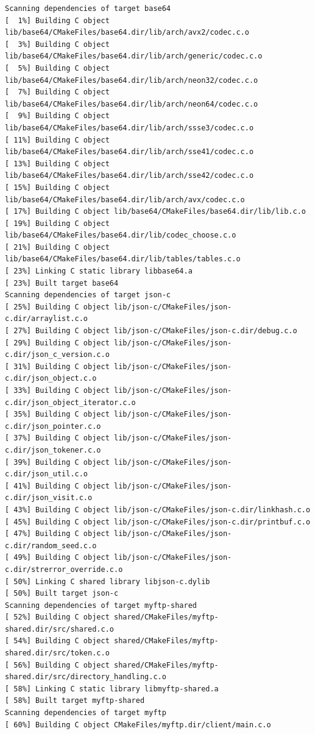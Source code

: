 \documentclass{article}
\begin{document}
\begin{lstlisting}
Scanning dependencies of target base64
[  1%] Building C object lib/base64/CMakeFiles/base64.dir/lib/arch/avx2/codec.c.o
[  3%] Building C object lib/base64/CMakeFiles/base64.dir/lib/arch/generic/codec.c.o
[  5%] Building C object lib/base64/CMakeFiles/base64.dir/lib/arch/neon32/codec.c.o
[  7%] Building C object lib/base64/CMakeFiles/base64.dir/lib/arch/neon64/codec.c.o
[  9%] Building C object lib/base64/CMakeFiles/base64.dir/lib/arch/ssse3/codec.c.o
[ 11%] Building C object lib/base64/CMakeFiles/base64.dir/lib/arch/sse41/codec.c.o
[ 13%] Building C object lib/base64/CMakeFiles/base64.dir/lib/arch/sse42/codec.c.o
[ 15%] Building C object lib/base64/CMakeFiles/base64.dir/lib/arch/avx/codec.c.o
[ 17%] Building C object lib/base64/CMakeFiles/base64.dir/lib/lib.c.o
[ 19%] Building C object lib/base64/CMakeFiles/base64.dir/lib/codec_choose.c.o
[ 21%] Building C object lib/base64/CMakeFiles/base64.dir/lib/tables/tables.c.o
[ 23%] Linking C static library libbase64.a
[ 23%] Built target base64
Scanning dependencies of target json-c
[ 25%] Building C object lib/json-c/CMakeFiles/json-c.dir/arraylist.c.o
[ 27%] Building C object lib/json-c/CMakeFiles/json-c.dir/debug.c.o
[ 29%] Building C object lib/json-c/CMakeFiles/json-c.dir/json_c_version.c.o
[ 31%] Building C object lib/json-c/CMakeFiles/json-c.dir/json_object.c.o
[ 33%] Building C object lib/json-c/CMakeFiles/json-c.dir/json_object_iterator.c.o
[ 35%] Building C object lib/json-c/CMakeFiles/json-c.dir/json_pointer.c.o
[ 37%] Building C object lib/json-c/CMakeFiles/json-c.dir/json_tokener.c.o
[ 39%] Building C object lib/json-c/CMakeFiles/json-c.dir/json_util.c.o
[ 41%] Building C object lib/json-c/CMakeFiles/json-c.dir/json_visit.c.o
[ 43%] Building C object lib/json-c/CMakeFiles/json-c.dir/linkhash.c.o
[ 45%] Building C object lib/json-c/CMakeFiles/json-c.dir/printbuf.c.o
[ 47%] Building C object lib/json-c/CMakeFiles/json-c.dir/random_seed.c.o
[ 49%] Building C object lib/json-c/CMakeFiles/json-c.dir/strerror_override.c.o
[ 50%] Linking C shared library libjson-c.dylib
[ 50%] Built target json-c
Scanning dependencies of target myftp-shared
[ 52%] Building C object shared/CMakeFiles/myftp-shared.dir/src/shared.c.o
[ 54%] Building C object shared/CMakeFiles/myftp-shared.dir/src/token.c.o
[ 56%] Building C object shared/CMakeFiles/myftp-shared.dir/src/directory_handling.c.o
[ 58%] Linking C static library libmyftp-shared.a
[ 58%] Built target myftp-shared
Scanning dependencies of target myftp
[ 60%] Building C object CMakeFiles/myftp.dir/client/main.c.o

\end{lstlisting}
\end{document}
